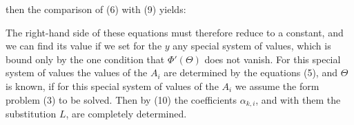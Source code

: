 

then the comparison of (6) with (9) yields:

The right-hand side of these equations must therefore reduce to a constant, and we can find its value if we set for the $y$ any special system of values, which is bound only by the one condition that $\Phi'(\Theta)$ does not vanish. For this special system of values the values of the $A_i$ are determined by the equations (5), and $\Theta$ is known, if for this special system of values of the $A_i$ we assume the form problem (3) to be solved. Then by (10) the coefficients $\alpha_{k,i}$, and with them the substitution $L$, are completely determined.

\noindent\hrulefill
